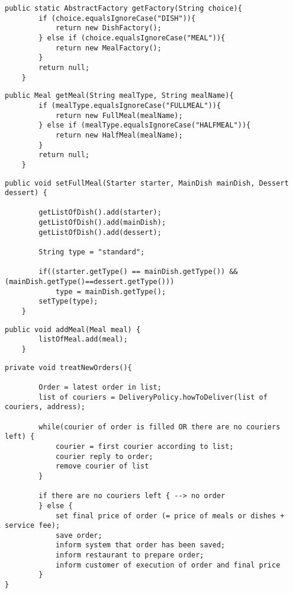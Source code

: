 
\begin{lstlisting}[caption= Factory producer for \texttt{Dish} and \texttt{Meal}.,
label=lst:createFactory]
public static AbstractFactory getFactory(String choice){
		if (choice.equalsIgnoreCase("DISH")){
			return new DishFactory();
		} else if (choice.equalsIgnoreCase("MEAL")){
			return new MealFactory();
		}
		return null;
	}
\end{lstlisting}

\begin{lstlisting}[caption=\emph{MealFactory} to create \texttt{Meal}.,
label=lst:mealCreator]
public Meal getMeal(String mealType, String mealName){
		if (mealType.equalsIgnoreCase("FULLMEAL")){
			return new FullMeal(mealName);
		} else if (mealType.equalsIgnoreCase("HALFMEAL")){
			return new HalfMeal(mealName);
		} 
		return null;		
	}
\end{lstlisting}

\begin{lstlisting}[caption=Set method to add \texttt{Dish} to \texttt{Meal}.,
label=lst:SetFullMeal]
public void setFullMeal(Starter starter, MainDish mainDish, Dessert dessert) {
		
		getListOfDish().add(starter);
		getListOfDish().add(mainDish);
		getListOfDish().add(dessert);
		
		String type = "standard";
			
		if((starter.getType() == mainDish.getType()) && (mainDish.getType()==dessert.getType()))
			type = mainDish.getType();
		setType(type);
	}
\end{lstlisting}

\begin{lstlisting}[caption=\emph{Add method} for \texttt{Meal}.,
label=lst:addMeal]
public void addMeal(Meal meal) {
		listOfMeal.add(meal);
	}
\end{lstlisting}

\begin{lstlisting}[caption=Method to treat \texttt{Order} of \texttt{Core}.,
label=lst:treatOrder]
private void treatNewOrders(){ 
	
		Order = latest order in list;
		list of couriers = DeliveryPolicy.howToDeliver(list of couriers, address);
			
		while(courier of order is filled OR there are no couriers left) { 
			courier = first courier according to list;
			courier reply to order;
			remove courier of list
		}

		if there are no couriers left { --> no order 
		} else {
			set final price of order (= price of meals or dishes + service fee);
			save order;
			inform system that order has been saved;
			inform restaurant to prepare order;
			inform customer of execution of order and final price 
		}
}
\end{lstlisting}

